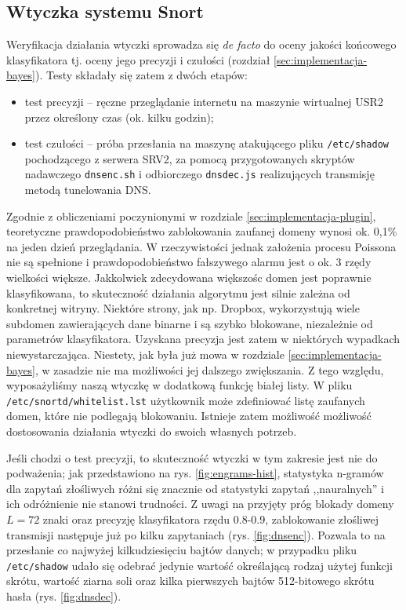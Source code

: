 \documentclass{eiti-raport}
\begin{document}
\subsection{Wtyczka systemu Snort} \label{sec:testy-wtyczka}
Weryfikacja działania wtyczki sprowadza się \emph{de facto} do oceny jakości końcowego klasyfikatora tj. oceny jego precyzji i czułości (rozdział \ref{sec:implementacja-bayes}). Testy składały się zatem z dwóch etapów: \begin{itemize}
	\item test precyzji -- ręczne przeglądanie internetu na maszynie wirtualnej USR2 przez określony czas (ok. kilku godzin);
	\item test czułości -- próba przesłania na maszynę atakującego pliku \texttt{/etc/shadow} pochodzącego z serwera SRV2, za pomocą przygotowanych skryptów nadawczego \texttt{dnsenc.sh} i odbiorczego \texttt{dnsdec.js} realizujących transmisję metodą tunelowania DNS.
\end{itemize}

Zgodnie z obliczeniami poczynionymi w rozdziale \ref{sec:implementacja-plugin}, teoretyczne prawdopodobieństwo zablokowania zaufanej domeny wynosi ok. 0,1\% na jeden dzień przeglądania. W rzeczywistości jednak założenia procesu Poissona nie są spełnione i prawdopodobieństwo fałszywego alarmu jest o ok. 3 rzędy wielkości większe. Jakkolwiek zdecydowana większośc domen jest poprawnie klasyfikowana, to skuteczność działania algorytmu jest silnie zależna od konkretnej witryny. Niektóre strony, jak np. Dropbox, wykorzystują wiele subdomen zawierających dane binarne i są szybko blokowane, niezależnie od parametrów klasyfikatora. Uzyskana precyzja jest zatem w niektórych wypadkach niewystarczająca. Niestety, jak była już mowa w rozdziale \ref{sec:implementacja-bayes}, w zasadzie nie ma możliwości jej dalszego zwiększania. Z tego względu, wyposażyliśmy naszą wtyczkę w dodatkową funkcję białej listy. W pliku \texttt{/etc/snortd/whitelist.lst} użytkownik może zdefiniować listę zaufanych domen, które nie podlegają blokowaniu. Istnieje zatem możliwość możliwość dostosowania działania wtyczki do swoich własnych potrzeb. 

Jeśli chodzi o test precyzji, to skuteczność wtyczki w tym zakresie jest nie do podważenia; jak przedstawiono na rys. \ref{fig:engrams-hist}, statystyka n-gramów dla zapytań złośliwych różni się znacznie od statystyki zapytań ,,nauralnych'' i ich odróżnienie nie stanowi trudności. Z uwagi na przyjęty próg blokady domeny $L = 72$ znaki oraz precyzję klasyfikatora rzędu 0.8-0.9, zablokowanie złośliwej transmisji następuje już po kilku zapytaniach (rys. \ref{fig:dnsenc}). Pozwala to na przesłanie co najwyżej kilkudziesięciu bajtów danych; w przypadku pliku \texttt{/etc/shadow} udało się odebrać jedynie wartość określającą rodzaj użytej funkcji skrótu, wartość ziarna soli oraz kilka pierwszych bajtów 512-bitowego skrótu hasła (rys. \ref{fig:dnsdec}). 
\end{document}
